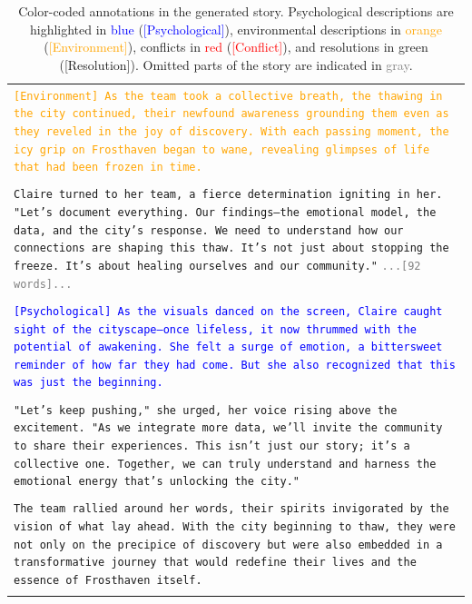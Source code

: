 \documentclass[letterpaper]{article} %
\begin{document}
\begin{small}
\begin{longtable}{p{\textwidth}}
    \texttt{\textcolor{orange}{[Environment] As the team took a collective breath, the thawing in the city continued, their newfound awareness grounding them even as they reveled in the joy of discovery. With each passing moment, the icy grip on Frosthaven began to wane, revealing glimpses of life that had been frozen in time.}} \\\\

    \texttt{Claire turned to her team, a fierce determination igniting in her. "Let's document everything. Our findings—the emotional model, the data, and the city's response. We need to understand how our connections are shaping this thaw. It's not just about stopping the freeze. It's about healing ourselves and our community."}
    \texttt{\textcolor{gray}{...[92 words]...}} \\\\

    \texttt{\textcolor{blue}{[Psychological] As the visuals danced on the screen, Claire caught sight of the cityscape—once lifeless, it now thrummed with the potential of awakening. She felt a surge of emotion, a bittersweet reminder of how far they had come. But she also recognized that this was just the beginning.}} \\\\

    \texttt{"Let's keep pushing," she urged, her voice rising above the excitement. "As we integrate more data, we'll invite the community to share their experiences. This isn't just our story; it's a collective one. Together, we can truly understand and harness the emotional energy that's unlocking the city."} \\\\

    \texttt{The team rallied around her words, their spirits invigorated by the vision of what lay ahead. With the city beginning to thaw, they were not only on the precipice of discovery but were also embedded in a transformative journey that would redefine their lives and the essence of Frosthaven itself.}

    \\
    \bottomrule

    \caption{Color-coded annotations in the generated story. Psychological descriptions are highlighted in \textcolor{blue}{blue} (\textcolor{blue}{[Psychological]}), environmental descriptions in \textcolor{orange}{orange} (\textcolor{orange}{[Environment]}), conflicts in \textcolor{red}{red} (\textcolor{red}{[Conflict]}), and resolutions in \textcolor{resolu_color}{green} (\textcolor{resolu_color}{[Resolution]}). Omitted parts of the story are indicated in \textcolor{gray}{gray}.}
    \label{tab:case_study}
  \end{longtable}
\end{small}
\end{document}
